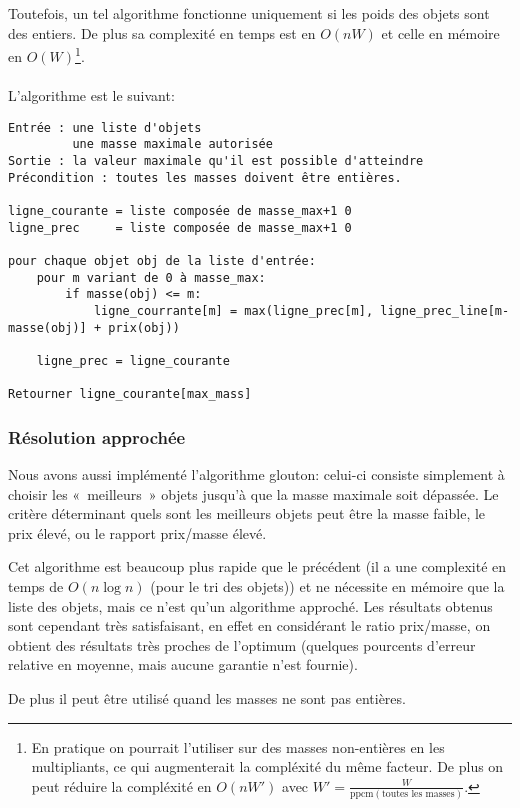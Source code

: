     Toutefois, un tel algorithme fonctionne uniquement si les poids des objets
    sont des entiers. De plus sa complexité en temps est en $O(nW)$ et celle en
    mémoire en $O(W)$\footnote{En pratique on pourrait l'utiliser sur des
    masses non-entières en les multipliants, ce qui augmenterait la compléxité
    du même facteur. De plus on peut réduire la compléxité en $O(nW')$ avec
    $W' = \frac W {\mathrm{ppcm}(\text{toutes les masses})}$.}.

    \paragraph{}
    L'algorithme est le suivant:
    \begin{lstlisting}
Entrée : une liste d'objets
         une masse maximale autorisée
Sortie : la valeur maximale qu'il est possible d'atteindre
Précondition : toutes les masses doivent être entières.

ligne_courante = liste composée de masse_max+1 0
ligne_prec     = liste composée de masse_max+1 0

pour chaque objet obj de la liste d'entrée:
    pour m variant de 0 à masse_max:
        if masse(obj) <= m:
            ligne_courrante[m] = max(ligne_prec[m], ligne_prec_line[m-masse(obj)] + prix(obj))

    ligne_prec = ligne_courante

Retourner ligne_courante[max_mass]
    \end{lstlisting}

  \subsubsection{Résolution approchée}
    Nous avons aussi implémenté l'algorithme glouton: celui-ci consiste
    simplement à choisir les «~meilleurs~» objets jusqu'à que la masse maximale
    soit dépassée. Le critère déterminant quels sont les meilleurs objets peut
    être la masse faible, le prix élevé, ou le rapport prix/masse élevé.

    Cet algorithme est beaucoup plus rapide que le précédent (il a une
    complexité en temps de $O(n \log n)$ (pour le tri des objets)) et ne
    nécessite en mémoire que la liste des objets, mais ce n'est qu'un algorithme
    approché. Les résultats obtenus sont cependant très satisfaisant, en effet
    en considérant le ratio \nobreak prix/masse, on obtient des résultats très
    proches de l'optimum (quelques pourcents d'erreur relative en moyenne, mais
    aucune garantie n'est fournie).

    De plus il peut être utilisé quand les masses ne sont pas entières.

